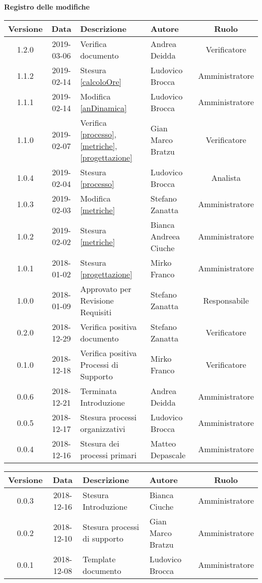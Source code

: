 \begin{center}
	\textbf{Registro delle modifiche}
	\end{center}
	\begin{center}
		\begin{tabularx}{\textwidth}{|c|c|X|X|c|}
			\hline
			\textbf{Versione} & \textbf{Data} & \textbf{Descrizione} & \textbf{Autore} & \textbf{Ruolo} \\
			\hline
			1.2.0 &2019-03-06 & Verifica documento &Andrea Deidda& Verificatore\\
			\hline
			1.1.2 &2019-02-14 &Stesura \ref{calcoloOre} &Ludovico Brocca& Amministratore\\
			\hline
			1.1.1 &2019-02-14 &Modifica \ref{anDinamica} &Ludovico Brocca& Amministratore\\
			\hline
			1.1.0 &2019-02-07 &Verifica \ref{processo}, \ref{metriche}, \ref{progettazione} &Gian Marco Bratzu& Verificatore\\
			\hline
			1.0.4 &2019-02-04&Stesura \ref{processo}&Ludovico Brocca& Analista\\
			\hline
			1.0.3 & 2019-02-03 & Modifica \ref{metriche} & Stefano Zanatta & Amministratore\\
			\hline
			1.0.2 & 2019-02-02 & Stesura \ref{metriche} & Bianca Andreea Ciuche & Amministratore\\
			\hline
			1.0.1 & 2018-01-02 & Stesura \ref{progettazione} & Mirko Franco & Amministratore \\
			\hline
			1.0.0 & 2018-01-09 & Approvato per Revisione Requisiti & Stefano Zanatta & Responsabile\\
			\hline
			0.2.0 & 2018-12-29 & Verifica positiva documento & Stefano Zanatta & Verificatore\\
			\hline
			0.1.0 & 2018-12-18 & Verifica positiva Processi di Supporto & Mirko Franco & Verificatore\\
			\hline
			0.0.6 & 2018-12-21 & Terminata Introduzione & Andrea Deidda & Amministratore\\
			\hline
			0.0.5 & 2018-12-17 & Stesura processi organizzativi & Ludovico Brocca & Amministratore\\
			\hline
			0.0.4 & 2018-12-16 & Stesura dei processi primari & Matteo Depascale & Amministratore\\
			\hline
		\end{tabularx}
	\begin{tabularx}{\textwidth}{|c|c|X|X|c|}
		\hline
		\textbf{Versione} & \textbf{Data} & \textbf{Descrizione} & \textbf{Autore} & \textbf{Ruolo} \\
		\hline
		0.0.3 & 2018-12-16 & Stesura Introduzione & Bianca Ciuche & Amministratore\\
		\hline
		0.0.2 & 2018-12-10 & Stesura processi di supporto & Gian Marco Bratzu & Amministratore\\	
		\hline
		0.0.1 & 2018-12-08 & Template documento  & Ludovico Brocca & Amministratore\\
		\hline
	\end{tabularx}
	\end{center}

\newpage